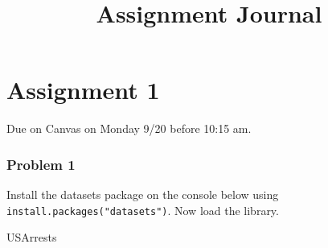 \documentclass[
]{article}
\title{Assignment Journal}
\author{}
\date{\vspace{-2.5em}}
\newenvironment{Shaded}{\begin{snugshade}}{\end{snugshade}}
\newcommand{\NormalTok}[1]{#1}
\begin{document}
\maketitle

{
\setcounter{tocdepth}{1}
\tableofcontents
}
\hypertarget{assignment-1}{%
\section{Assignment 1}\label{assignment-1}}

Due on Canvas on Monday 9/20 before 10:15 am.

\hypertarget{problem-1}{%
\subsubsection{Problem 1}\label{problem-1}}

Install the datasets package on the console below using
\texttt{install.packages("datasets")}. Now load the library.

\begin{Shaded}
\begin{Highlighting}[]
\NormalTok{USArrests}
\end{Highlighting}
\end{Shaded}
\end{document}
